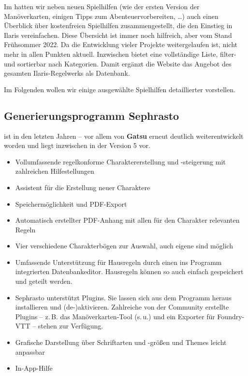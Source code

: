 \spaltenanfang
Im 
hatten wir neben neuen Spielhilfen (wie der ersten Version der Manöverkarten, einigen Tipps zum Abenteuervorbereiten, \dots) auch einen Überblick über kostenfreien Spielhilfen zusammengestellt, die den Einstieg in Ilaris vereinfachen.
Diese Übersicht ist immer noch hilfreich, aber vom Stand Früh\-som\-mer 2022.
Da die Entwicklung vieler Projekte weitergelaufen ist, nicht mehr in allen Punkten aktuell.
Inzwischen bietet  eine vollständige Liste, filter- und sortierbar nach Kategorien. Damit ergänzt die Website das Angebot des gesamten Ilaris-Regelwerks als Datenbank.

Im Folgenden wollen wir einige ausgewählte Spielhilfen detaillierter vorstellen.

\subsection*{Generierungsprogramm Sephrasto}
 ist in den letzten Jahren -- vor allem von \textbf{Gatsu} erneut deutlich weiterentwickelt worden und liegt inzwischen in der Version 5 vor.

\begin{itemize}
\item Vollumfassende regelkonforme Charaktererstellung und -steigerung mit zahlreichen Hilfestellungen
\item 	Assistent für die Erstellung neuer Charaktere
\item	Speichermöglichkeit und PDF-Export
\item	Automatisch erstellter PDF-Anhang mit allen für den Charakter relevanten Regeln
\item	Vier verschiedene Charakterbögen zur Auswahl, auch eigene sind möglich
\item	Umfassende Unterstützung für Hausregeln durch einen ins Programm integrierten Datenbankeditor. Hausregeln können so auch einfach gespeichert und geteilt werden.
\item	Sephrasto unterstützt Plugins. Sie lassen sich aus dem Programm heraus installieren und (de-)aktivieren.
Zahlreiche von der Community erstellte Plugins -- z.\,B. das Manöverkarten-Tool (s.\,u.) und ein Exporter für Foundry-VTT -- stehen zur Verfügung.
\item	Grafische Darstellung über Schriftarten und -größen und Themes leicht anpassbar
\item	In-App-Hilfe
\end{itemize}

